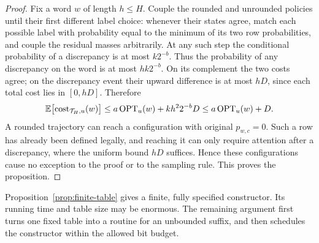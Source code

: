 \begin{proof}
Fix a word $w$ of length $h\le H$. Couple the rounded and unrounded
policies until their first different label choice: whenever their
states agree, match each possible label with probability equal to the
minimum of its two row probabilities, and couple the residual masses
arbitrarily. At any such step the conditional probability of a
discrepancy is at most $k2^{-b}$. Thus the probability of any discrepancy
on the word is at most $hk2^{-b}$. On its complement the two costs
agree; on the discrepancy event their upward difference is at most
$hD$, since each total cost lies in $[0,hD]$. Therefore
\[
 \mathbb E\bigl[\operatorname{cost}_{\mathcal T_H,u}(w)\bigr]
 \le a\operatorname{OPT}_u(w)+k h^2 2^{-b}D
 \le a\operatorname{OPT}_u(w)+D.
\]
A rounded trajectory can reach a configuration with original
$p_{w,c}=0$. Such a row has already been defined legally, and reaching
it can only require attention after a discrepancy, where the uniform
bound $hD$ suffices. Hence these configurations cause no exception to
the proof or to the sampling rule. This proves the proposition.
\end{proof}

Proposition~\ref{prop:finite-table} gives a finite, fully specified
constructor. Its running time and table size may be enormous. The
remaining argument first turns one fixed table into a routine for an
unbounded suffix, and then schedules the constructor within the allowed
bit budget.
